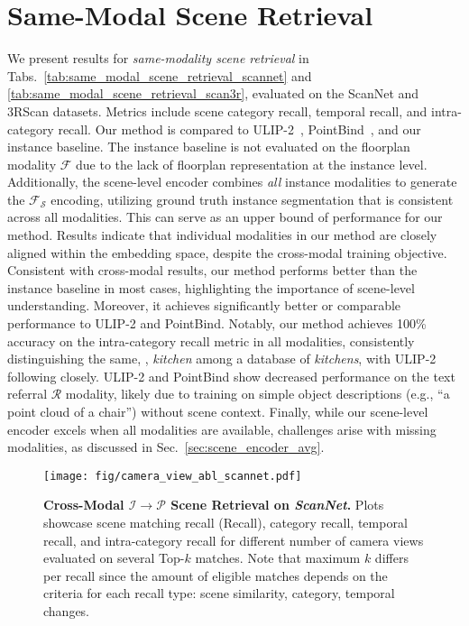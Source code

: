 \section{Same-Modal Scene Retrieval}
\label{sec:same_modal_scene_retrieval}
We present results for \textit{same-modality scene retrieval} in Tabs.~\ref{tab:same_modal_scene_retrieval_scannet} and \ref{tab:same_modal_scene_retrieval_scan3r}, evaluated on the ScanNet and 3RScan datasets. Metrics include scene category recall, temporal recall, and intra-category recall. Our method is compared to ULIP-2~\cite{xue2023ulip2}, PointBind~\cite{pointbind}, and our instance baseline. The instance baseline is not evaluated on the floorplan modality $\mathcal{F}$ due to the lack of floorplan representation at the instance level. Additionally, the scene-level encoder combines \textit{all} instance modalities to generate the $\mathcal{F_S}$ encoding, utilizing ground truth instance segmentation that is consistent across all modalities. This can serve as an upper bound of performance for our method. 
Results indicate that individual modalities in our method are closely aligned within the embedding space, despite the cross-modal training objective. Consistent with cross-modal results, our method performs better than the instance baseline in most cases, highlighting the importance of scene-level understanding. Moreover, it achieves significantly better or comparable performance to ULIP-2 and PointBind. Notably, our method achieves 100\% accuracy on the intra-category recall metric in all modalities, consistently distinguishing the same, \eg, \textit{kitchen} among a database of \textit{kitchens}, with ULIP-2 following closely. ULIP-2 and PointBind show decreased performance on the text referral $\mathcal{R}$ modality, likely due to training on simple object descriptions (e.g., “a point cloud of a chair”) without scene context. Finally, while our scene-level encoder excels when all modalities are available, challenges arise with missing modalities, as discussed in Sec.~\ref{sec:scene_encoder_avg}.



\begin{figure*}
    \centering
    \texttt{[image: fig/camera\_view\_abl\_scannet.pdf]}
    \vspace{-20pt}
    \caption{\textbf{Cross-Modal $\mathcal{I} \rightarrow \mathcal{P}$ Scene Retrieval on \textit{ScanNet}.} Plots showcase scene matching recall (Recall), category recall, temporal recall, and intra-category recall for different number of camera views evaluated on several Top-$k$ matches. Note that maximum $k$ differs per recall since the amount of eligible matches depends on the criteria for each recall type: scene similarity, category, temporal changes.}
    \label{fig:camera_view_abl_scannet}
\end{figure*}

